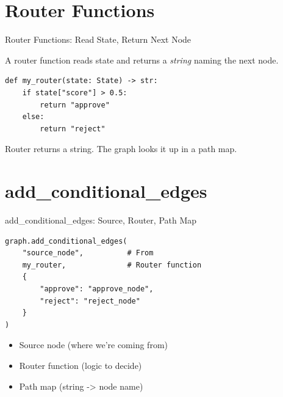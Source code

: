\documentclass[aspectratio=169,11pt]{beamer}
\begin{document}
\section{Router Functions}
\begin{frame}[fragile,t]{Router Functions: Read State, Return Next Node}
\vspace{0.1cm}

\begin{conceptbox}
A router function reads state and returns a \textit{string} naming the next node.
\end{conceptbox}

\vspace{0.1cm}

\begin{codebox}
\begin{lstlisting}
def my_router(state: State) -> str:
    if state["score"] > 0.5:
        return "approve"
    else:
        return "reject"
\end{lstlisting}
\end{codebox}

\vspace{0.1cm}

{\footnotesize Router returns a string. The graph looks it up in a path map.}
\end{frame}

\section{add_conditional_edges}
\begin{frame}[fragile,t]{add\_conditional\_edges: Source, Router, Path Map}
\vspace{0.05cm}

\begin{codebox}
\begin{lstlisting}
graph.add_conditional_edges(
    "source_node",          # From
    my_router,              # Router function
    {
        "approve": "approve_node",
        "reject": "reject_node"
    }
)
\end{lstlisting}
\end{codebox}

\vspace{0.1cm}

\begin{tipbox}
\setlength{\itemsep}{1pt}
\begin{itemize}
  \item Source node (where we're coming from)
  \item Router function (logic to decide)
  \item Path map (string -> node name)
\end{itemize}
\end{tipbox}
\end{frame}
\end{document}
